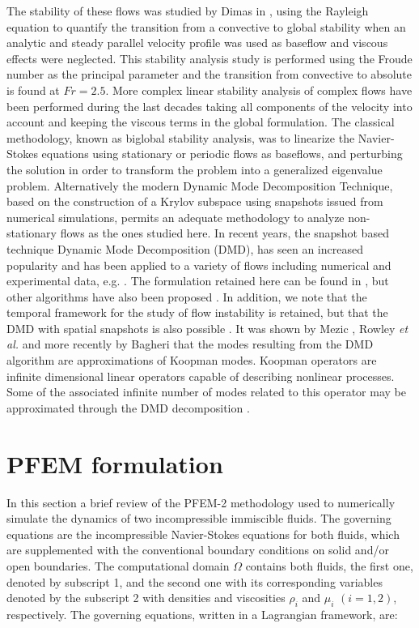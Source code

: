 \documentclass[a4paper,conference]{IEEEtran}
\begin{document}
The stability of these flows was studied by Dimas in \cite{Dimas89}, using the Rayleigh equation to quantify the transition from a convective to global stability when an analytic and steady parallel velocity profile was used as baseflow and viscous effects were neglected. This stability analysis study is performed using the Froude number as the principal parameter and the transition from convective to absolute is found at $Fr=2.5$. More complex linear stability analysis of complex flows have been performed during the last decades taking all components of the velocity into account and keeping the viscous terms in the global formulation. The classical methodology, known as biglobal stability analysis, was to linearize the Navier-Stokes equations using stationary or periodic flows as baseflows, and perturbing the solution in order to transform the problem into a generalized eigenvalue problem. Alternatively the modern Dynamic Mode Decomposition Technique, based on the construction of a Krylov subspace using 
snapshots issued from numerical simulations, permits an adequate methodology to analyze non-stationary flows as the ones studied here. In recent years, the snapshot based technique Dynamic Mode Decomposition (DMD), has seen an increased popularity \cite{DMDSchmid,princeton} and has been applied to a variety of flows including numerical and experimental data, e.g. \cite{Bagheri_Cyl,Mezic_koopman,Rowley_JFM,Soria_DMD}. The formulation retained here can be found in \cite{DMDSchmid}, but other algorithms have also been proposed \cite{princeton,SparsityDMD}. In addition, we note that the temporal framework for the study of flow instability is retained, but that the DMD with spatial snapshots is also possible \cite{DMDSchmid}. It was shown by Mezic \cite{Mezic_koopman}, Rowley \textit{et al.} \cite{Rowley_JFM} and more recently by Bagheri \cite{Bagheri_Cyl} that the modes resulting from the DMD algorithm are approximations of Koopman modes. Koopman operators are infinite dimensional linear operators capable of 
describing nonlinear processes. Some of the associated infinite number of modes related to this operator may be approximated through the DMD decomposition \cite{Mezic_koopman}.

\section{PFEM formulation}\label{GeneralFor}

In this section a brief review of the PFEM-2 methodology used to numerically simulate the dynamics of two incompressible immiscible fluids. The governing equations are the incompressible Navier-Stokes equations for both fluids, which are supplemented with the conventional boundary conditions on solid and/or open boundaries. The computational domain $\Omega$ contains both fluids, the first one, denoted by subscript 1, and the second one with its corresponding variables denoted by the subscript 2 with densities and viscosities $\rho_i$ and $\mu_i$ $(i=1,2)$, respectively. The governing equations, written in a Lagrangian framework, are:
\end{document}

